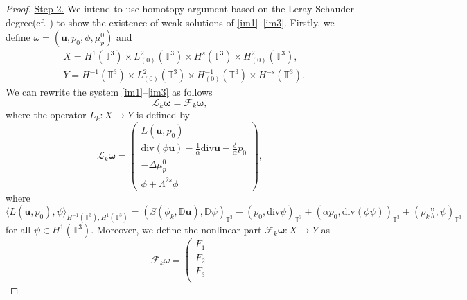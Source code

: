 \documentclass[reqno,a4paper,11pt]{amsart}
\theoremstyle{plain}
\numberwithin{equation}{section}
\begin{document}
\begin{proof}
	
	\underline{Step 2.}
	We intend to use homotopy argument based on the Leray-Schauder degree(cf. \cite{NL,TPT}) to  show the existence of weak solutions of  \eqref{im1}--\eqref{im3}. Firstly, we define $\omega=(\mathbf{u},p_{0},\phi,\mu_{p}^{0})$ and
	\begin{align*}
		& X= H^{1}(\mathbb{T}^{3})\times L_{(0)}^{2}(\mathbb{T}^{3})\times H^{s}(\mathbb{T}^{3})\times H_{(0)}^{2}(\mathbb{T}^{3}),
		\\&Y= H^{-1}(\mathbb{T}^{3})\times L_{(0)}^{2}(\mathbb{T}^{3})\times H_{(0)}^{-1}(\mathbb{T}^{3})\times H^{-s}(\mathbb{T}^{3}).
	\end{align*}
	We can rewrite the system \eqref{im1}--\eqref{im3} as follows
	\begin{equation*}
		\mathcal{L}_{k}\mathbf{\omega}=\mathcal{F}_{k}\mathbf{\omega},
	\end{equation*}
	where  the operator $L_{k}:X\rightarrow Y$  is defined by
	\begin{equation}\label{main model}
		\mathcal{L}_{k}\mathbf{\omega}=
		\left(
		\begin{array}{c}
			L(\mathbf{u},p_{0})
			\\
			\mathrm{div}(\phi\mathbf{u})-\frac{1}{\alpha}\mathrm{div}  \mathbf{u} -\frac{\delta}{\alpha} p_{0}%
			\\
			-\Delta\mu_{p}^{0} \\
			\phi+\Lambda^{2s}\phi
		\end{array}
		\right),
	\end{equation}
	where $\langle L(\mathbf{u},p_{0}),\psi\rangle_{H^{-1}(\mathbb{T}^{3}),H^{1}(\mathbb{T}^{3})}=(S(\phi_{k},\mathbb{ D}\mathbf{u}),\mathbb{ D}\psi)_{\mathbb{T}^{3}}-(p_{0},\mathrm{div}\psi)_{\mathbb{T}^{3}}+(\alpha p_{0},\mathrm{div}(\phi\psi))_{\mathbb{T}^{3}}+(\rho_{k}\frac{\mathbf{u}}{h},\psi)_{\mathbb{T}^{3}}$ for all $\psi\in H^{1}(\mathbb{T}^{3})$. Moreover, we define the nonlinear part  $\mathcal{F}_{k}\mathbf{\omega}:X\rightarrow Y$ as
	\begin{equation*}
		\mathcal{F}_{k}\omega=
		\left
		(\begin{array}{c}
			F_{1}\\
			F_{2}\\
			F_{3}\\

\end{array}
\end{equation*}
\end{proof}
\end{document}
